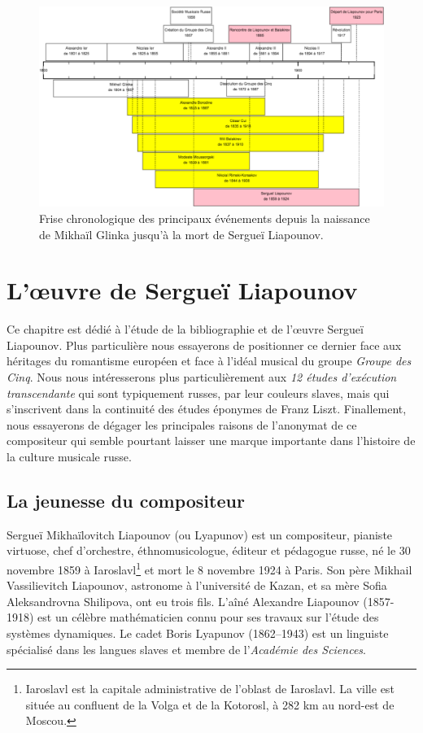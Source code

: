 \begin{figure}[!ht]
  \begin{bigcenter}
    \includegraphics[width=15.5cm, keepaspectratio]{frise.png}
  \end{bigcenter}
  \caption{\label{frise}Frise chronologique des principaux événements depuis la naissance de Mikhaïl Glinka jusqu'à la mort de Sergueï Liapounov.}
\end{figure}


\chapter{L'œuvre de Sergueï Liapounov}

Ce chapitre est dédié à l'étude de la bibliographie et de l'œuvre Sergueï Liapounov. Plus particulière nous essayerons de positionner ce dernier face aux héritages du romantisme européen et face à l'idéal musical du groupe \emph{Groupe des Cinq}. Nous nous intéresserons plus particulièrement aux \emph{12 études d'exécution transcendante} qui sont typiquement russes, par leur couleurs slaves, mais qui s'inscrivent dans la continuité des études éponymes de Franz Liszt. Finallement, nous essayerons de dégager les principales raisons de l'anonymat de ce compositeur qui semble pourtant laisser une marque importante dans l'histoire de la culture musicale russe.

\section{La jeunesse du compositeur}

Sergueï Mikhaïlovitch Liapounov (ou Lyapunov) est un compositeur, pianiste virtuose, chef d'orchestre, éthnomusicologue, éditeur et pédagogue russe, né le 30 novembre 1859 à Iaroslavl\footnote{Iaroslavl est la capitale administrative de l'oblast de Iaroslavl. La ville est située au confluent de la Volga et de la Kotorosl, à 282 km au nord-est de Moscou.} et mort le 8 novembre 1924 à Paris. Son père Mikhail Vassilievitch Liapounov, astronome à l'université de Kazan, et sa mère Sofia Aleksandrovna Shilipova, ont eu trois fils. L'aîné Alexandre Liapounov (1857-1918) est un célèbre mathématicien connu pour ses travaux sur l'étude des systèmes dynamiques. Le cadet Boris Lyapunov (1862–1943) est un linguiste spécialisé dans les langues slaves et membre de l'\emph{Académie des Sciences}.

